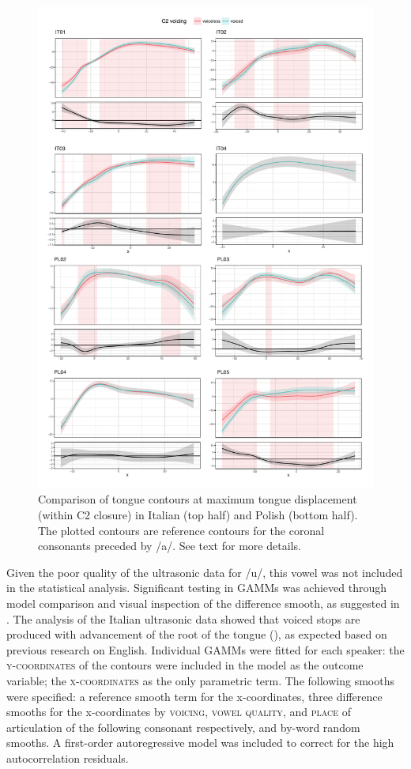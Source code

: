 \documentclass[authoryear, twocolumn]{elsarticle}
\begin{document}
\begin{figure}
    \centering
    \includegraphics[height=.9\textheight]{fig/tra.pdf}
    \caption{Comparison of tongue contours at maximum tongue displacement (within C2 closure) in Italian (top half) and Polish (bottom half). The plotted contours are reference contours for the coronal consonants preceded by /a/. See text for more details.}
    \label{f:tra}
\end{figure}

Given the poor quality of the ultrasonic data for /u/, this vowel was
not included in the statistical analysis. Significant testing in GAMMs
was achieved through model comparison and visual inspection of the
difference smooth, as suggested in \citep{soskuthy2017}. The analysis of
the Italian ultrasonic data showed that voiced stops are produced with
advancement of the root of the tongue (), as expected based on previous
research on English. Individual GAMMs were fitted for each speaker: the
\textsc{y-coordinates} of the contours were included in the model as the
outcome variable; the \textsc{x-coordinates} as the only parametric
term. The following smooths were specified: a reference smooth term for
the x-coordinates, three difference smooths for the x-coordinates by
\textsc{voicing}, \textsc{vowel quality}, and \textsc{place} of
articulation of the following consonant respectively, and by-word random
smooths. A first-order autoregressive model was included to correct for
the high autocorrelation residuals.
\end{document}
